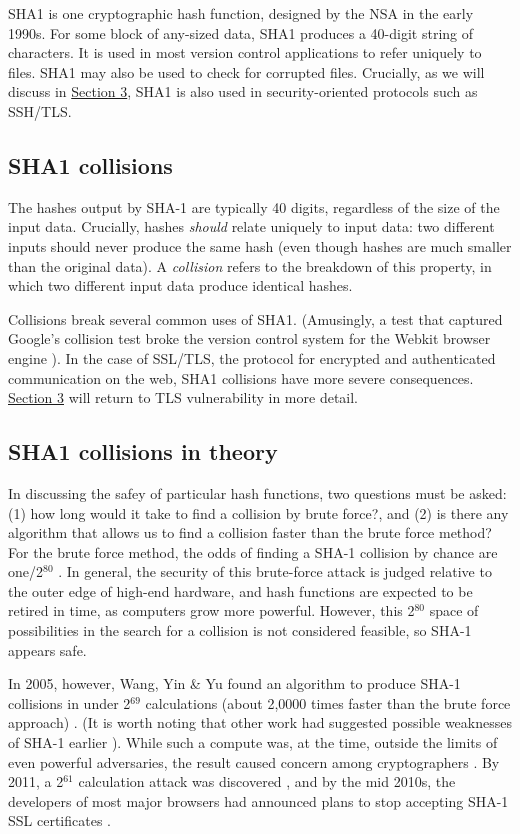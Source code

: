 \documentclass[sigconf]{acmart}
\begin{document}
SHA1 is one cryptographic hash function, designed by the NSA in the early 1990s.
For some block of any-sized data, SHA1 produces a 40-digit string of characters.
It is used in most version control applications to refer uniquely to files. SHA1 may also be used to check for corrupted files. 
Crucially, as we will discuss in \uline{Section 3}, SHA1 is also used in security-oriented protocols such as SSH/TLS.


\subsection{SHA1 collisions}
\label{sec:org620ecb9}

The hashes output by SHA-1 are typically 40 digits, regardless of the size of the input data.
Crucially, hashes \emph{should} relate uniquely to input data: 
two different inputs should never produce the same hash (even though hashes are much smaller than the original data).
A \emph{collision} refers to the breakdown of this property,
in which two different input data produce identical hashes.

Collisions break several common uses of SHA1. 
(Amusingly, a test that captured Google's collision test broke the version control system for the Webkit browser engine \cite{Koivisto2017}).
In the case of SSL/TLS, the protocol for encrypted and authenticated communication on the web, SHA1 collisions have more severe consequences.
\uline{Section 3} will return to TLS vulnerability in more detail.

\subsection{SHA1 collisions in theory}
\label{sec:org66fd996}

In discussing the safey of particular hash functions, two questions must be asked:
(1) how long would it take to find a collision by brute force?, and 
(2) is there any algorithm that allows us to find a collision faster than the brute force method?
For the brute force method, the odds of finding a SHA-1 collision by chance are one/2\(^{\text{80}}\)
\cite{Schneier2005}.
In general, the security of this brute-force attack is judged relative to the outer edge of high-end hardware, and hash functions are expected to be retired in time, as computers grow more powerful.
However, this 2\(^{\text{80}}\) space of possibilities in the search for a collision is not considered feasible, so SHA-1 appears safe.

In 2005, however, Wang, Yin \& Yu found an algorithm to produce SHA-1 collisions in under 2\(^{\text{69}}\) calculations (about 2,0000 times faster than the brute force approach)
\cite{Wang2005}.
(It is worth noting that other work had suggested possible weaknesses of SHA-1 earlier \cite{Biham2005}).
While such a compute was, at the time, outside the limits of even powerful adversaries,
the result caused concern among cryptographers \cite{Schneier2005}.
By 2011, a 2\(^{\text{61}}\) calculation attack was discovered \cite{Stevens2013a},
and by the mid 2010s, the developers of most major browsers had announced plans to stop accepting SHA-1 SSL certificates 
\cite{Mozilla2017,Sleevi2014}.
\end{document}
